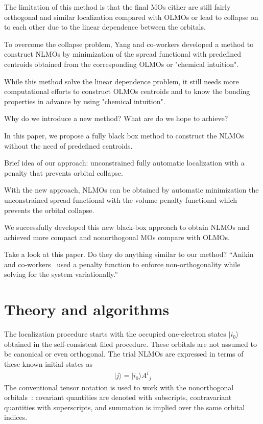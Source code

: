 \documentclass[aps,prl,reprint,amsmath,amssymb]{revtex4-1}
\newcommand{\ket}[1]{\ensuremath{\vert #1 \rangle}}
\begin{document}
The limitation of this method is that the final MOs either are still fairly orthogonal and similar localization compared with OLMOs or lead to collapse on to each other due to the linear dependence between the orbitals.

To overcome the collapse problem, Yang and co-workers  developed a method to construct NLMOs by minimization of the spread functional with predefined centroids obtained from the corresponding OLMOs or "chemical intuition".

While this method solve the linear dependence problem, it still needs more computational efforts to construct OLMOs centroids and to know the bonding properties in advance by using "chemical intuition".

Why do we introduce a new method? What are do we hope to achieve?

In this paper, we propose a fully black box method to construct the NLMOs without the need of predefined centroids.

Brief idea of our approach: unconstrained fully automatic localization with a penalty that prevents orbital collapse.

With the new approach, NLMOs can be obtained by automatic minimization the unconstrained spread functional with the volume penalty functional which prevents the orbital collapse.

We successfully developed this new black-box approach to obtain NLMOs and achieved more compact and nonorthogonal MOs compare with OLMOs.

Take a look at this paper. 
Do they do anything similar to our method? 
``Anikin and co-workers~\cite{anikin2004} used a penalty function to enforce non-orthogonality while solving for the system variationally.''


\section{Theory and algorithms}

The localization procedure starts with the occupied one-electron states $\ket{i_0}$ obtained in the self-consistent filed procedure. These orbitals are not assumed to be canonical or even orthogonal. The trial NLMOs are expressed in terms of these known initial states as
%
\begin{equation}
\begin{split}
\ket{j} = \ket{i_0} {A^i}_j  
\end{split}
\end{equation}
%
The conventional tensor notation is used to work with the nonorthogonal orbitals~\cite{head1998tensor}: covariant quantities are denoted with subscripts, contravariant quantities with superscripts, and summation is implied over the same orbital indices.
\end{document}
